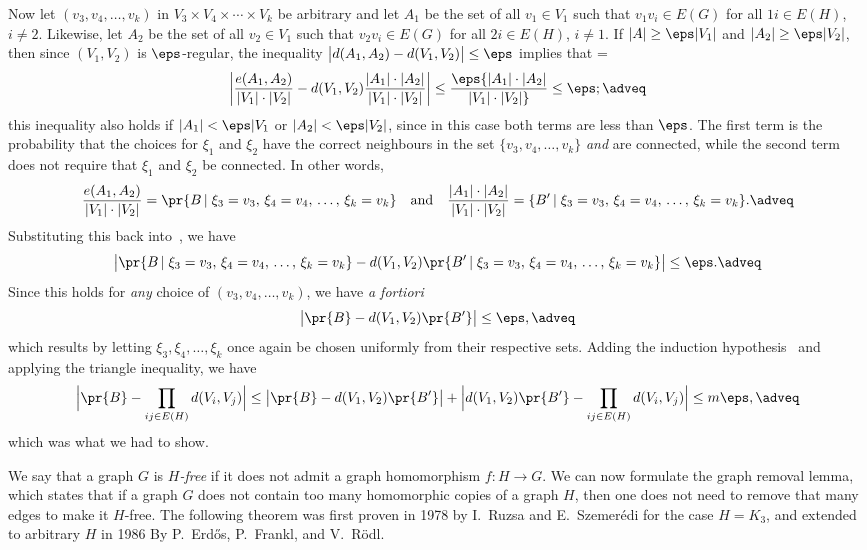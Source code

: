 Now let $(v_3,v_4,\ldots,v_k)$ in $V_3\times V_4\times\cdots\times V_k$ be arbitrary and let $A_1$ be the set
of all $v_1\in V_1$ such that $v_1v_i\in E(G)$ for all $1i\in E(H)$, $i\neq 2$. Likewise, let $A_2$ be the set of all
$v_2\in V_1$ such that $v_2v_i \in E(G)$ for all $2i\in E(H)$, $i\neq 1$. If $|A|\geq\eps|V_1|$ and $|A_2|\geq\eps
|V_2|$, then since $(V_1,V_2)$ is $\eps$-regular, the inequality $\big|d(A_1,A_2)-d(V_1,V_2)\big|\leq \eps$ implies
that
\newcount\diff
\diff=\eqcount
$$\bigg| {e(A_1,A_2)\over |V_1|\cdot|V_2|} - d(V_1,V_2){|A_1|\cdot|A_2|\over |V_1|\cdot|V_2|}\bigg|\leq
\eps{|A_1|\cdot|A_2|\over |V_1|\cdot|V_2|} \leq \eps;\adveq$$
this inequality also holds if $|A_1|<\eps|V_1$ or $|A_2|<\eps|V_2|$, since in this case both terms are less than
$\eps$.
The first term is the probability that the choices for $\xi_1$ and $\xi_2$ have the correct neighbours in the set
$\{v_3,v_4,\ldots,v_k\}$ {\it and}
are connected, while the second term does not require that $\xi_1$ and $\xi_2$ be connected. In other words,
$${e(A_1,A_2)\over |V_1|\cdot|V_2|} = \pr\{B\given \xi_3 = v_3,\,\xi_4 = v_4,\,\ldots,\,\xi_k=v_k\}\quad\hbox{and}\quad
{|A_1|\cdot|A_2|\over |V_1|\cdot|V_2|} = \{B'\given\xi_3 = v_3,\,\xi_4 = v_4,\,\ldots,\,\xi_k=v_k\}.\adveq$$
Substituting this back into~, we have
$$\big|\pr\{B\given \xi_3 = v_3,\,\xi_4 = v_4,\,\ldots,\,\xi_k=v_k\} - d(V_1,V_2)\pr\{B'\given
\xi_3 = v_3,\,\xi_4 = v_4,\,\ldots,\,\xi_k=v_k\}\big|\leq \eps.\adveq$$
Since this holds for {\it any} choice of $(v_3,v_4,\ldots,v_k)$, we have {\it a fortiori}
$$\big|\pr\{B\} - d(V_1,V_2)\pr\{B'\}\big|\leq \eps,\adveq$$
which results by letting $\xi_3,\xi_4,\ldots,\xi_k$ once again be chosen uniformly from their respective sets.
Adding the induction hypothesis~ and applying the triangle inequality, we have
$$\Big|\pr\{B\} - \prod_{ij\in E(H)} d(V_i,V_j)\Big| \le
\big|\pr\{B\} - d(V_1,V_2)\pr\{B'\}\big| +
\Big|d(V_1,V_2)\pr\{B'\} - \prod_{ij\in E(H)} d(V_i,V_j)\Big| \leq
m\eps,\adveq$$
which was what we had to show.\slug

We say that a graph $G$ is {\it $H$-free} if it does not admit a graph homomorphism $f: H\to G$.
We can now formulate the graph removal lemma, which states that if a graph $G$ does not contain too many homomorphic
copies of a graph $H$, then one does not need to remove that many edges to make it $H$-free. The following
theorem was first proven in 1978 by I.~Ruzsa and E.~Szemer\'edi for the case $H = K_3$, and extended to arbitrary
$H$ in 1986 By P.~Erd\H os, P.~Frankl, and V.~R\"odl.

